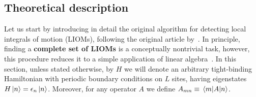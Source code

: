 \subsection{Theoretical description}
Let us start by introducing in detail the original algorithm for detecting local integrals
of motion (LIOMs), following the original article by~\textcite{Mierzejewski2015a}.
In principle, finding a \textbf{complete set of LIOMs} is a conceptually
nontrivial task, however, this procedure reduces it to a simple application of linear algebra~\autocite{Mierzejewski2015a}.
In this section, unless stated otherwise, by \(H\) we will denote an arbitrary
tight-binding Hamiltonian with periodic boundary conditions
on \(L\) sites, having eigenstates \(H \ket{n} = \epsilon_{n} \ket{n}\). Moreover,
for any operator \(A\) we define \(A_{mn} \equiv \matrixel{m}{A}{n}\).

